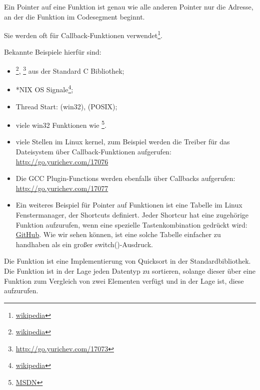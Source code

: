 \newcommand{\comp}{\TT{comp()}\xspace}
\label{sec:pointerstofunctions}

\myindex{\CLanguageElements!\Pointers}
Ein Pointer auf eine Funktion ist genau wie alle anderen Pointer nur die Adresse, an der die Funktion im Codesegment
beginnt.

Sie werden oft für Callback-Funktionen verwendet\footnote{\href{http://go.yurichev.com/17071}{wikipedia}}.

Bekannte Beispiele hierfür sind:

\begin{itemize}
\item \qsort\footnote{\href{http://go.yurichev.com/17072}{wikipedia}},
{}\footnote{\url{http://go.yurichev.com/17073}} aus der Standard C Bibliothek; 

\item *NIX OS Signale\footnote{\href{http://go.yurichev.com/17074}{wikipedia}};

\item Thread Start:  (win32),  (POSIX);

\item viele win32 Funktionen wie \footnote{\href{http://go.yurichev.com/17075}{MSDN}}.

\item viele Stellen im Linux kernel, zum Beispiel werden die Treiber für das Dateisystem über Callback-Funktionen
aufgerufen:
\url{http://go.yurichev.com/17076}

\item Die GCC Plugin-Functions werden ebenfalls über Callbacks aufgerufen: 
\url{http://go.yurichev.com/17077}
\item Ein weiteres Beispiel für Pointer auf Funktionen ist eine Tabelle im  Linux Fenstermanager, der Shortcuts
definiert. Jeder Shortcur hat eine zugehörige Funktion aufzurufen, wenn eine spezielle Tastenkombination gedrückt wird:
\href{http://go.yurichev.com/17078}{GitHub}. Wie wir sehen können, ist eine solche Tabelle einfacher zu handhaben als
ein großer switch()-Ausdruck.
\end{itemize}

Die Funktion \qsort ist eine Implementierung von Quicksort in der \CCpp Standardbibliothek.
Die Funktion ist in der Lage jeden Datentyp zu sortieren, solange dieser über eine Funktion zum Vergleich von zwei
Elementen verfügt und \qsort in der Lage ist, diese aufzurufen.

